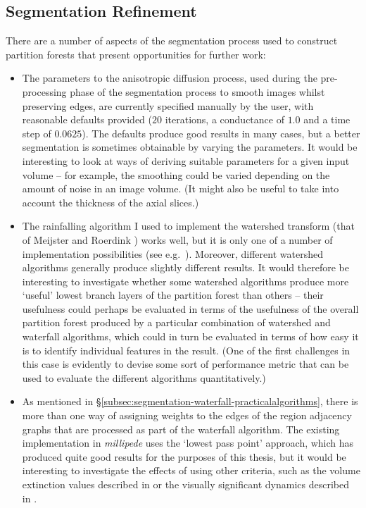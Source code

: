 \subsection{Segmentation Refinement}

There are a number of aspects of the segmentation process used to construct partition forests that present opportunities for further work:
%
\begin{itemize}

\item The parameters to the anisotropic diffusion process, used during the pre-processing phase of the segmentation process to smooth images whilst preserving edges, are currently specified manually by the user, with reasonable defaults provided ($20$ iterations, a conductance of $1.0$ and a time step of $0.0625$). The defaults produce good results in many cases, but a better segmentation is sometimes obtainable by varying the parameters. It would be interesting to look at ways of deriving suitable parameters for a given input volume -- for example, the smoothing could be varied depending on the amount of noise in an image volume. (It might also be useful to take into account the thickness of the axial slices.)

\item The rainfalling algorithm I used to implement the watershed transform (that of Meijster and Roerdink \cite{meijster98}) works well, but it is only one of a number of implementation possibilities (see e.g.~\cite{roerdink01}). Moreover, different watershed algorithms generally produce slightly different results. It would therefore be interesting to investigate whether some watershed algorithms produce more `useful' lowest branch layers of the partition forest than others -- their usefulness could perhaps be evaluated in terms of the usefulness of the overall partition forest produced by a particular combination of watershed and waterfall algorithms, which could in turn be evaluated in terms of how easy it is to identify individual features in the result. (One of the first challenges in this case is evidently to devise some sort of performance metric that can be used to evaluate the different algorithms quantitatively.)


\item As mentioned in \S\ref{subsec:segmentation-waterfall-practicalalgorithms}, there is more than one way of assigning weights to the edges of the region adjacency graphs that are processed as part of the waterfall algorithm. The existing implementation in \emph{millipede} uses the `lowest pass point' approach, which has produced quite good results for the purposes of this thesis, but it would be interesting to investigate the effects of using other criteria, such as the volume extinction values described in \cite{vachier95} or the visually significant dynamics described in \cite{climent06}.

\end{itemize}

